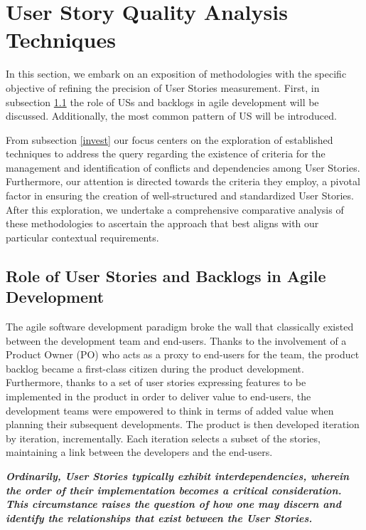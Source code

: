 \section{User Story Quality Analysis Techniques}\label{usq}
In this section, we embark on an exposition of methodologies with the specific objective of refining the precision of User Stories measurement. First, in subsection \ref{us} the role of USs and backlogs in agile development will be discussed. Additionally, the most common pattern of US will be introduced.

From subsection \ref{invest} our focus centers on the exploration of established techniques to address the query regarding the existence of criteria for the management and identification of conflicts and dependencies among User Stories. Furthermore, our attention is directed towards the criteria they employ, a pivotal factor in ensuring the creation of well-structured and standardized User Stories. After this exploration, we undertake a comprehensive comparative analysis of these methodologies to ascertain the approach that best aligns with our particular contextual requirements.
\subsection{Role of User Stories and Backlogs in Agile Development} \label{us}
The agile software development paradigm broke the wall that classically existed between the development team and end-users. Thanks to the involvement of a Product Owner (PO) who acts as a proxy to end-users for the team, the product backlog \cite{sedano2019product} became a first-class citizen during the product development. Furthermore, thanks to a set of user stories expressing features to be implemented in the product in order to deliver value to end-users, the development teams were empowered to think in terms of added value when planning their subsequent developments. The product is then developed iteration by iteration, incrementally. Each iteration selects a subset of the stories, maintaining a link between the developers and the end-users\cite{mosser2022modelling}. 

\textbf{\emph{Ordinarily, User Stories typically exhibit interdependencies, wherein the order of their implementation becomes a critical consideration. This circumstance raises the question of how one may discern and identify the relationships that exist between the User Stories.}}

